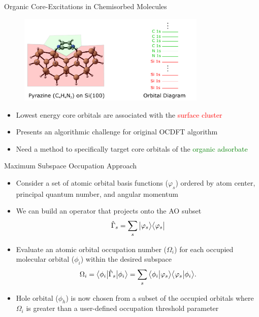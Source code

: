 \documentclass[t]{beamer}
\newcommand{\bra}[2][0]
{\ifthenelse{\equal{#1}{0}}{\left\langle #2 \right|}
{\ifthenelse{\equal{#1}{1}}{\big\langle #2 \big|}
{\ifthenelse{\equal{#1}{2}}{\Big\langle #2 \Big|}
{\ifthenelse{\equal{#1}{3}}{\bigg\langle #2 \bigg|}
{\ifthenelse{\equal{#1}{4}}{\Bigg\langle #2 \Bigg|}
{Error}}}}}
}
\newcommand{\braket}[3][0]
{\ifthenelse{\equal{#1}{0}}{\left\langle #2 \middle| #3 \right\rangle}
{\ifthenelse{\equal{#1}{1}}{\big\langle #2 \big| #3 \big\rangle}
{\ifthenelse{\equal{#1}{2}}{\Big\langle #2 \Big| #3 \Big\rangle}
{\ifthenelse{\equal{#1}{3}}{\bigg\langle #2 \bigg| #3 \bigg\rangle}
{\ifthenelse{\equal{#1}{4}}{\Bigg\langle #2 \Bigg| #3 \Bigg\rangle}
{Error}}}}}
}
\newcommand{\ket}[2][0]
{\ifthenelse{\equal{#1}{0}}{\left| #2 \right\rangle}
{\ifthenelse{\equal{#1}{1}}{\big| #2 \big\rangle}
{\ifthenelse{\equal{#1}{2}}{\Big| #2 \Big\rangle}
{\ifthenelse{\equal{#1}{3}}{\bigg| #2 \bigg\rangle}
{\ifthenelse{\equal{#1}{4}}{\Bigg| #2 \Bigg\rangle}
{Error}}}}}
}
\begin{document}
\begin{frame}{Organic Core-Excitations in Chemisorbed Molecules}
\begin{figure}
\includegraphics[width=0.8\textwidth]{pyrazine_si_100_slide_3.pdf}
\end{figure}
\begin{itemize}
\item Lowest energy core orbitals are associated with the \textcolor{red}{surface cluster}
\item Presents an algorithmic challenge for original OCDFT algorithm
\item Need a method to specifically target core orbitals of the \textcolor{green}{organic adsorbate}
\end{itemize}
\end{frame}

\begin{frame}{Maximum Subspace Occupation Approach}
\begin{itemize}
\item Consider a set of atomic orbital basis functions ($\varphi_{s}$) ordered by atom center, principal quantum number, and angular momentum
\item We can build an operator that projects onto the AO subset
\begin{equation}
\hat{\Gamma}_{s} = \sum_{s}\ket[1]{\varphi_{s}}\bra[1]{\varphi_{s}}
\end{equation}
\item Evaluate an atomic orbital occupation number ($\Omega_i$) for each occupied molecular orbital ($\phi_i$) within the desired subspace
\begin{equation}
\Omega_i = \bra[1]{\phi_i} \hat{\Gamma}_{s} \ket[1]{\phi_i} = \sum_{s} \braket[1]{\phi_i}{\varphi_{s}}\braket[1]{\varphi_{s}}{\phi_i}.
\end{equation}
\item Hole orbital ($\phi_h$) is now chosen from a subset of the occupied orbitals where $\Omega_i$ is greater than a user-defined occupation threshold parameter
\end{itemize}
\end{frame}
\end{document}
